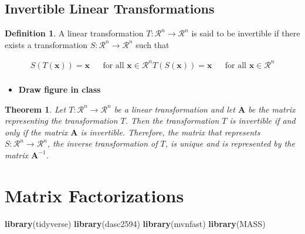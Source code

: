 \documentclass[
]{book}
\newenvironment{Shaded}{\begin{snugshade}}{\end{snugshade}}
\newcommand{\KeywordTok}[1]{\textcolor[rgb]{0.13,0.29,0.53}{\textbf{#1}}}
\newcommand{\NormalTok}[1]{#1}
\providecommand{\tightlist}{%
  \setlength{\itemsep}{0pt}\setlength{\parskip}{0pt}}
\newtheorem{theorem}{Theorem}[chapter]
\theoremstyle{definition}
\newtheorem{definition}{Definition}[chapter]
\theoremstyle{definition}
\theoremstyle{definition}
\theoremstyle{definition}
\theoremstyle{remark}
\begin{document}
\hypertarget{invertible-linear-transformations}{%
\section{Invertible Linear Transformations}\label{invertible-linear-transformations}}

\begin{definition}
A linear transformation \(T:\mathcal{R}^n \rightarrow \mathcal{R}^n\) is said to be invertible if there exists a transformation \(S:\mathcal{R}^n \rightarrow \mathcal{R}^n\) such that

\[
\begin{aligned}
S(T(\mathbf{x})) = \mathbf{x} && \mbox{for all } \mathbf{x} \in \mathcal{R}^n
T(S(\mathbf{x})) = \mathbf{x} && \mbox{for all } \mathbf{x} \in \mathcal{R}^n \\
\end{aligned}
\]
\end{definition}

\begin{itemize}
\tightlist
\item
  \textbf{Draw figure in class}
\end{itemize}

\begin{theorem}
Let \(T:\mathcal{R}^n \rightarrow \mathcal{R}^n\) be a linear transformation and let \(\mathbf{A}\) be the matrix representing the transformation \(T\). Then the transformation \(T\) is invertible if and only if the matrix \(\mathbf{A}\) is invertible. Therefore, the matrix that represents \(S:\mathcal{R}^n \rightarrow \mathcal{R}^n\), the inverse transformation of \(T\), is unique and is represented by the matrix \(\mathbf{A}^{-1}\).
\end{theorem}

\hypertarget{matrix-factorizations}{%
\chapter{Matrix Factorizations}\label{matrix-factorizations}}

\begin{Shaded}
\begin{Highlighting}[]
\KeywordTok{library}\NormalTok{(tidyverse)}
\KeywordTok{library}\NormalTok{(dasc2594)}
\KeywordTok{library}\NormalTok{(mvnfast)}
\KeywordTok{library}\NormalTok{(MASS)}
\end{Highlighting}
\end{Shaded}
\end{document}
